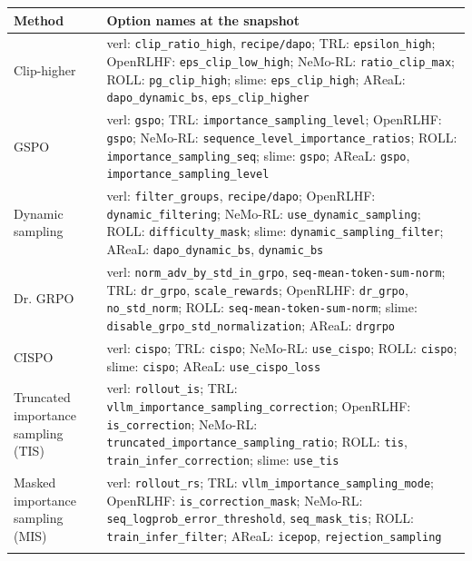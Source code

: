 \begin{tabularx}{\linewidth}{>{\raggedright\arraybackslash}p{3.2cm} >{\raggedright\arraybackslash}X}
\toprule
Method & Option names at the snapshot \\
\midrule
Clip-higher & verl: \texttt{clip\_ratio\_high}, \texttt{recipe/dapo}; TRL: \texttt{epsilon\_high}; OpenRLHF: \texttt{eps\_clip\_low\_high}; NeMo-RL: \texttt{ratio\_clip\_max}; ROLL: \texttt{pg\_clip\_high}; slime: \texttt{eps\_clip\_high}; AReaL: \texttt{dapo\_dynamic\_bs}, \texttt{eps\_clip\_higher} \\ \addlinespace[3pt]
GSPO & verl: \texttt{gspo}; TRL: \texttt{importance\_sampling\_level}; OpenRLHF: \texttt{gspo}; NeMo-RL: \texttt{sequence\_level\_importance\_ratios}; ROLL: \texttt{importance\_sampling\_seq}; slime: \texttt{gspo}; AReaL: \texttt{gspo}, \texttt{importance\_sampling\_level} \\ \addlinespace[3pt]
Dynamic sampling & verl: \texttt{filter\_groups}, \texttt{recipe/dapo}; OpenRLHF: \texttt{dynamic\_filtering}; NeMo-RL: \texttt{use\_dynamic\_sampling}; ROLL: \texttt{difficulty\_mask}; slime: \texttt{dynamic\_sampling\_filter}; AReaL: \texttt{dapo\_dynamic\_bs}, \texttt{dynamic\_bs} \\ \addlinespace[3pt]
Dr. GRPO & verl: \texttt{norm\_adv\_by\_std\_in\_grpo}, \texttt{seq-mean-token-sum-norm}; TRL: \texttt{dr\_grpo}, \texttt{scale\_rewards}; OpenRLHF: \texttt{dr\_grpo}, \texttt{no\_std\_norm}; ROLL: \texttt{seq-mean-token-sum-norm}; slime: \texttt{disable\_grpo\_std\_normalization}; AReaL: \texttt{drgrpo} \\ \addlinespace[3pt]
CISPO & verl: \texttt{cispo}; TRL: \texttt{cispo}; NeMo-RL: \texttt{use\_cispo}; ROLL: \texttt{cispo}; slime: \texttt{cispo}; AReaL: \texttt{use\_cispo\_loss} \\ \addlinespace[3pt]
Truncated importance sampling (TIS) & verl: \texttt{rollout\_is}; TRL: \texttt{vllm\_importance\_sampling\_correction}; OpenRLHF: \texttt{is\_correction}; NeMo-RL: \texttt{truncated\_importance\_sampling\_ratio}; ROLL: \texttt{tis}, \texttt{train\_infer\_correction}; slime: \texttt{use\_tis} \\ \addlinespace[3pt]
Masked importance sampling (MIS) & verl: \texttt{rollout\_rs}; TRL: \texttt{vllm\_importance\_sampling\_mode}; OpenRLHF: \texttt{is\_correction\_mask}; NeMo-RL: \texttt{seq\_logprob\_error\_threshold}, \texttt{seq\_mask\_tis}; ROLL: \texttt{train\_infer\_filter}; AReaL: \texttt{icepop}, \texttt{rejection\_sampling} \\ \addlinespace[3pt]

\end{tabularx}
